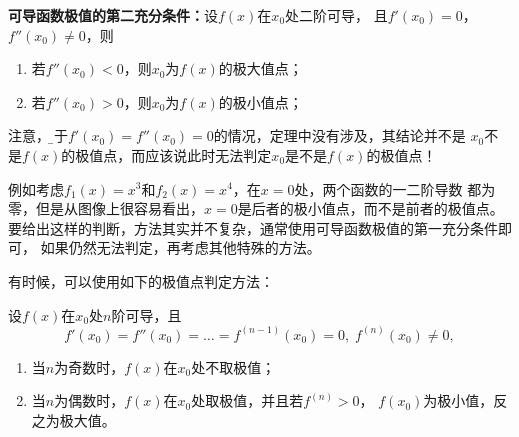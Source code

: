 \begin{thx}
	{\bf 可导函数极值的第二充分条件：}设$f(x)$在$x_0$处二阶可导，
	且$f'(x_0)=0$，$f''(x_0)\ne 0$，则
	\begin{enumerate}[(1)]
	  \item 若$f''(x_0)<0$，则$x_0$为$f(x)$的极大值点；
	  \item 若$f''(x_0)>0$，则$x_0$为$f(x)$的极小值点；
	\end{enumerate}
\end{thx}

注意，{\b 对于$f'(x_0)=f''(x_0)=0$的情况，定理中没有涉及，其结论并不是
$x_0$不是$f(x)$的极值点，而应该说此时无法判定$x_0$是不是$f(x)$的极值点！}

例如考虑$f_1(x)=x^3$和$f_2(x)=x^4$，在$x=0$处，两个函数的一二阶导数
都为零，但是从图像上很容易看出，$x=0$是后者的极小值点，而不是前者的极值点。
要给出这样的判断，方法其实并不复杂，通常使用可导函数极值的第一充分条件即可，
如果仍然无法判定，再考虑其他特殊的方法。

有时候，可以使用如下的极值点判定方法：

\begin{thx}
	设$f(x)$在$x_0$处$n$阶可导，且
	  $$f'(x_0)=f''(x_0)=\ldots=f^{(n-1)}(x_0)=0,\;f^{(n)}(x_0)\ne 0,$$
	  \begin{enumerate}[(1)]
		\item 当$n$为奇数时，$f(x)$在$x_0$处不取极值；
		\item 当$n$为偶数时，$f(x)$在$x_0$处取极值，并且若$f^{(n)}>0$，
		$f(x_0)$为极小值，反之为极大值。
	  \end{enumerate}
\end{thx}


